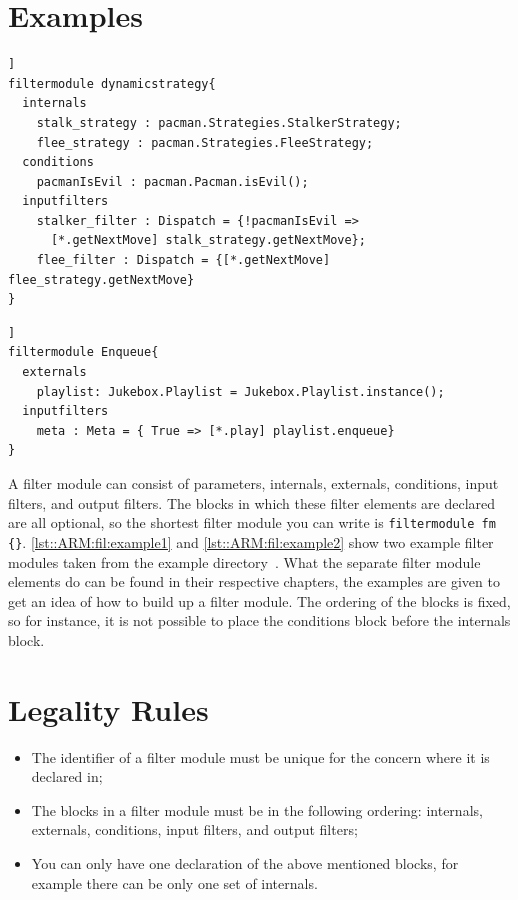\section*{Examples}
\begin{lstlisting}[caption={Dynamic strategy filter module from Pacman },label=lst::ARM:fil:example1,style=listing,language=ComposeStar,float=[tpb]]
filtermodule dynamicstrategy{
  internals
    stalk_strategy : pacman.Strategies.StalkerStrategy;
    flee_strategy : pacman.Strategies.FleeStrategy;   
  conditions
    pacmanIsEvil : pacman.Pacman.isEvil();
  inputfilters
    stalker_filter : Dispatch = {!pacmanIsEvil => 
      [*.getNextMove] stalk_strategy.getNextMove};
    flee_filter : Dispatch = {[*.getNextMove] flee_strategy.getNextMove}
}
\end{lstlisting}
\begin{lstlisting}[caption={Enqueue filter module from Jukebox },label=lst::ARM:fil:example2,style=listing,language=ComposeStar,float=[tpb]]
filtermodule Enqueue{
  externals
    playlist: Jukebox.Playlist = Jukebox.Playlist.instance();
  inputfilters
    meta : Meta = { True => [*.play] playlist.enqueue}
}
\end{lstlisting}
A filter module can consist of parameters, internals, externals, conditions, input filters, and output filters.
The blocks in which these filter elements are declared are all optional, so the shortest filter module you can write is \lstinline!filtermodule fm {}!. \autoref{lst::ARM:fil:example1}
and \autoref{lst::ARM:fil:example2} show two example filter modules taken from the \Compose* example directory~\cite{Composestar}. What the separate filter module elements do can be found in their respective
chapters, the examples are given to get an idea of how to build up a filter module.
The ordering of the blocks is fixed, so for instance, it is not possible to place the conditions block before the internals block.

\section*{Legality Rules}
\begin{itemize}[noitemsep]
\item The identifier of a filter module must be unique for the concern where it is declared in;
\item The blocks in a filter module must be in the following ordering: internals, externals, conditions, input filters, and output filters;
\item You can only have one declaration of the above mentioned blocks, for example there can be only one set of internals.
\end{itemize}

\comments{

}
